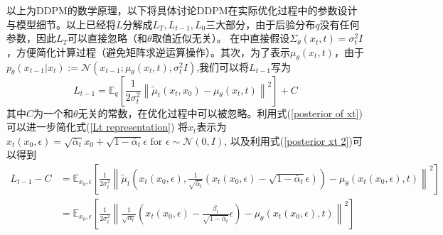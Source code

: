 以上为DDPM的数学原理，以下将具体讨论DDPM在实际优化过程中的参数设计与模型细节。以上已经将$L$分解成$L_T,L_{t-1},L_0$三大部分，由于后验分布$q$没有任何参数，因此$L_T$可以直接忽略（和$\theta$取值近似无关）。
在\cite{DDPM}中直接假设$\Sigma_{\theta}(x_t,t)=\sigma_t^2 I$，方便简化计算过程（避免矩阵求逆运算操作）。其次，为了表示$\mu_{\theta}(x_t,t)$，由于$p_{\theta}(x_{t-1}|x_t):= \mathcal{N}(x_{t-1};\mu_{\theta}(x_t,t),\sigma_t^2I)$,我们可以将$L_{t-1}$写为
\begin{equation}
    L_{t-1}=\mathbb{E}_q\left[\frac{1}{2 \sigma_t^2}\left\|\tilde{{\mu}}_t\left({x}_t, {x}_0\right)-{\mu}_\theta\left({x}_t, t\right)\right\|^2\right]+C
    \label{Lt representation}
\end{equation}
其中$C$为一个和$\theta$无关的常数，在优化过程中可以被忽略。利用式(\ref{posterior of xt})可以进一步简化式(\ref{Lt representation}) 将$x_t$表示为${x}_t\left({x}_0, {\epsilon}\right)=\sqrt{\bar{\alpha}_t} {x}_0+\sqrt{1-\bar{\alpha}_t} {\epsilon} \text { for } {\epsilon} \sim \mathcal{N}({0}, {I}) $, 以及利用式(\ref{posterior xt 2})可以得到
\begin{align}
    L_{t-1}-C&=\mathbb{E}_{{x}_0, {\epsilon}}\left[\frac{1}{2 \sigma_t^2}\left\|\tilde{{\mu}}_t\left({x}_t\left({x}_0, {\epsilon}\right), \frac{1}{\sqrt{\bar{\alpha}_t}}\left({x}_t\left({x}_0, {\epsilon}\right)-\sqrt{1-\bar{\alpha}_t} {\epsilon}\right)\right)-{\mu}_\theta\left({x}_t\left({x}_0, {\epsilon}\right), t\right)\right\|^2\right]\\
&=\mathbb{E}_{{x}_0, {\epsilon}}\left[\frac{1}{2 \sigma_t^2}\left\|\frac{1}{\sqrt{\alpha_t}}\left({x}_t\left({x}_0, {\epsilon}\right)-\frac{\beta_t}{\sqrt{1-\bar{\alpha}_t}} {\epsilon}\right)-{\mu}_\theta\left({x}_t\left({x}_0, {\epsilon}\right), t\right)\right\|^2\right]
\end{align}
